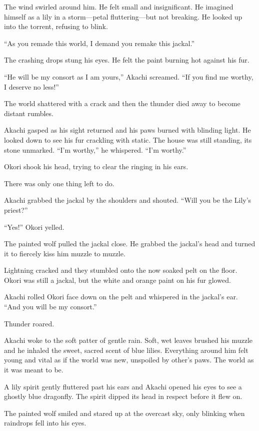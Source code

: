 The wind swirled around him. He felt small and insignificant. He imagined himself as a lily in a storm---petal fluttering---but not breaking. He looked up into the torrent, refusing to blink.

``As you remade this world, I demand you remake this jackal.''

The crashing drops stung his eyes. He felt the paint burning hot against his fur.

``He will be my consort as I am yours,'' Akachi screamed. ``If you find me worthy, I deserve no less!''

The world shattered with a crack and then the thunder died away to become distant rumbles.

Akachi gasped as his sight returned and his paws burned with blinding light. He looked down to see his fur crackling with static. The house was still standing, its stone unmarked. ``I'm worthy,'' he whispered. ``I'm worthy.'' 

Okori shook his head, trying to clear the ringing in his ears.

There was only one thing left to do. 

Akachi grabbed the jackal by the shoulders and shouted. ``Will you be the Lily's priest?''

``Yes!'' Okori yelled.

The painted wolf pulled the jackal close. He grabbed the jackal's head and turned it to fiercely kiss him muzzle to muzzle.

Lightning cracked and they stumbled onto the now soaked pelt on the floor. Okori was still a jackal, but the white and orange paint on his fur glowed.

Akachi rolled Okori face down on the pelt and whispered in the jackal's ear. ``And you will be my consort.''

Thunder roared.

\secdiv

\noindent Akachi woke to the soft patter of gentle rain. Soft, wet leaves brushed his muzzle and he inhaled the sweet, sacred scent of blue lilies. Everything around him felt young and vital as if the world was new, unspoiled by other's paws. The world as it was meant to be.

A lily spirit gently fluttered past his ears and Akachi opened his eyes to see a ghostly blue dragonfly. The spirit dipped its head in respect before it flew on. 

The painted wolf smiled and stared up at the overcast sky, only blinking when raindrops fell into his eyes.

